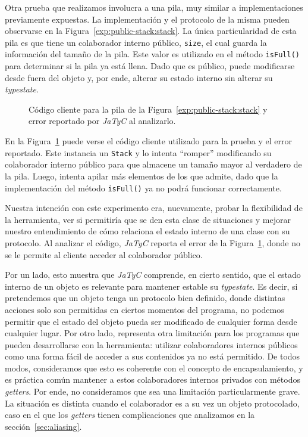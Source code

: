 Otra prueba que realizamos involucra a una pila, muy similar a implementaciones previamente expuestas. La implementación y el protocolo de la misma pueden observarse en la Figura~\ref{exp:public-stack:stack}. La única particularidad de esta pila es que tiene un colaborador interno público, \texttt{size}, el cual guarda la información del tamaño de la pila. Este valor es utilizado en el método \texttt{isFull()} para determinar si la pila ya está llena. Dado que es público, puede modificarse desde fuera del objeto y, por ende, alterar su estado interno sin alterar su \textit{typestate}.

\begin{figure}[htbp]
    \centering
    
    \vspace{0.3cm}
    
    \caption{Código cliente para la pila de la Figura~\ref{exp:public-stack:stack} y error reportado por \textit{JaTyC} al analizarlo.}
    \label{exp:public-stack:error}
\end{figure}

En la Figura~\ref{exp:public-stack:error} puede verse el código cliente utilizado para la prueba y el error reportado. Este instancia un \texttt{Stack} y lo intenta ``romper'' modificando su colaborador interno público para que almacene un tamaño mayor al verdadero de la pila. Luego, intenta apilar más elementos de los que admite, dado que la implementación del método \texttt{isFull()} ya no podrá funcionar correctamente.

Nuestra intención con este experimento era, nuevamente, probar la flexibilidad de la herramienta, ver si permitiría que se den esta clase de situaciones y mejorar nuestro entendimiento de cómo relaciona el estado interno de una clase con su protocolo. Al analizar el código, \textit{JaTyC} reporta el error de la Figura~\ref{exp:public-stack:error}, donde no se le permite al cliente acceder al colaborador público.

Por un lado, esto muestra que \textit{JaTyC} comprende, en cierto sentido, que el estado interno de un objeto es relevante para mantener estable su \textit{typestate}. Es decir, si pretendemos que un objeto tenga un protocolo bien definido, donde distintas acciones solo son permitidas en ciertos momentos del programa, no podemos permitir que el estado del objeto pueda ser modificado de cualquier forma desde cualquier lugar. Por otro lado, representa otra limitación para los programas que pueden desarrollarse con la herramienta: utilizar colaboradores internos públicos como una forma fácil de acceder a sus contenidos ya no está permitido. De todos modos, consideramos que esto es coherente con el concepto de encapsulamiento, y es práctica común mantener a estos colaboradores internos privados con métodos \textit{getters}. Por ende, no consideramos que sea una limitación particularmente grave. La situación es distinta cuando el colaborador es a su vez un objeto protocolado, caso en el que los \textit{getters} tienen complicaciones que analizamos en la sección~\ref{sec:aliasing}.

